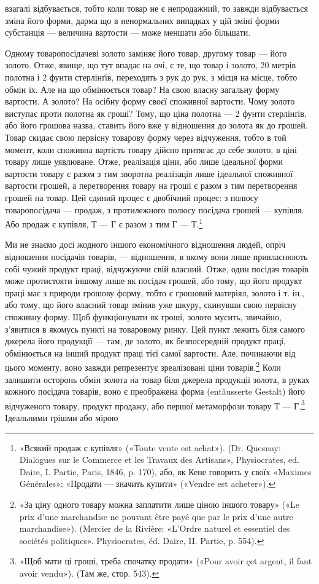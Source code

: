 взагалі відбувається, тобто коли товар не є непродажний, то
завжди відбувається зміна його форми, дарма що в ненормальних
випадках у цій зміні форми субстанція — величина вартости —
може меншати або більшати.

Одному товаропосідачеві золото заміняє його товар, другому
товар — його золото. Отже, явище, що тут впадає на очі, є те, що
товар і золото, 20 метрів полотна і 2 фунти стерлінґів, переходять
з рук до рук, з місця на місце, тобто обмін їх. Але на що обмінюється
товар? На свою власну загальну форму вартости. А золото?
На осібну форму своєї споживної вартости. Чому золото
виступає проти полотна як гроші? Тому, що ціна полотна —
2 фунти стерлінґів, або його грошова назва, ставить його вже у
відношення до золота як до грошей. Товар скидає свою первісну
товарову форму через відчуження, тобто в той момент, коли споживна
вартість товару дійсно притягає до себе золото, в ціні товару
лише уявлюване. Отже, реалізація ціни, або лише ідеальної форми
вартости товару є разом з тим зворотна реалізація лише ідеальної
споживної вартости грошей, а перетворення товару на гроші є
разом з тим перетворення грошей на товар. Цей єдиний процес
є двобічний процес: з полюсу товаропосідача — продаж, з протилежного
полюсу посідача грошей — купівля. Або продаж є купівля,
Т — Г є разом з тим Г — Т.\footnote{
«Всякий продаж є купівля» («Toute vente est achat»). (Dr. Quesnay:
Dialogues sur le Commerce et les Travaux des Artisans», Physiocrates,
ed. Daire, I. Partie, Paris, 1846, p. 170), або, як Кене говорить у своїх
«Maximes Générales»: «Продати — значить купити» («Vendre est acheter»).
}

Ми не знаємо досі жодного іншого економічного відношення
людей, опріч відношення посідачів товарів, — відношення, в
якому вони лише привласнюють собі чужий продукт праці, відчужуючи
свій власний. Отже, один посідач товарів може протистояти
іншому лише як посідач грошей, або тому, що його продукт
праці має з природи грошову форму, тобто є грошовий матеріял,
золото і т. ін., або тому, що його власний товар змінив уже
шкуру, скинувши свою первісну споживну форму. Щоб функціонувати
як гроші, золото мусить, звичайно, з’явитися в якомусь
пункті на товаровому ринку. Цей пункт лежить біля самого
джерела його продукції — там, де золото, як безпосередній продукт
праці, обмінюється на інший продукт праці тієї самої вартости.
Але, починаючи від цього моменту, воно завжди репрезентує
зреалізовані ціни товарів.\footnote{
«За ціну одного товару можна заплатити лише ціною іншого товару»
(«Le prix d’une marchandise ne pouvant être payé que par le prix
d’une autre marchandise»). (Mercier de la Rivière: «L’Ordre naturel et
essentiel des sociétés politiques». Physiocrates, éd. Daire, II. Partie, p. 554).
} Коли залишити осторонь
обмін золота на товар біля джерела продукції золота, в руках
кожного посідача товарів, воно є преображена форма (entäusserte
Gestalt) його відчуженого товару, продукт продажу, або першої
метаморфози товару Т — Г.\footnote{
«Щоб мати ці гроші, треба спочатку продати» («Pour avoir çet
argent, il faut avoir vendu»). (Там же, стор. 543).
} Ідеальними грішми або мірою